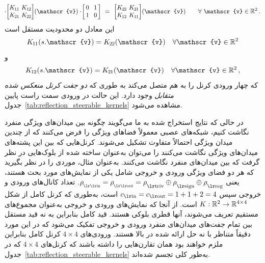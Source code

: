\begin{itemize}
\begin{align}
		\!\cdot\!
		\begin{bmatrix} \Koo &\mkern-12mu \Kot \\ \Kto &\mkern-12mu \Ktt \end{bmatrix} \mkern-4mu (\mathscr{v})
		\cdot\!
		\begin{bmatrix} \hspace{1.5pt} 0 &\mkern-4mu 1 \hspace*{1.5pt} \\ \hspace{1.5pt} 1 &\mkern-4mu 0 \hspace*{1.5pt} \end{bmatrix}
		\ =\ 
		\begin{bmatrix} \Ktt &\mkern-12mu \Kto \\ \Kot &\mkern-12mu \Koo \end{bmatrix} \mkern-4mu (\mathscr{v})
		\qquad \forall\ \mathscr{v} \in \R^2 \,.
	\end{align}
	این معادل دو محدودیت مستقل است
	\begin{align}
		\Koo(s.\mathscr{v}) = \Ktt(\mathscr{v}) \quad \forall \mathscr{v} \in \R^2
	\end{align}
	و
	\begin{align}
		\Kot(s.\mathscr{v}) = \Kto(\mathscr{v}) \quad \forall \mathscr{v} \in \R^2 \,,
	\end{align}
	که چهار ورودی کرنل را به هم متصل می‌کند به طوری که \emph{دو جفت کرنل منعکس شده متقابل} وجود دارد.
	این حالت در ورودی سمت راست پایین جدول~\ref{tab:reflection_steerable_kernels} مشاهده می‌شود.
\end{itemize}

در حالی که نتایج استخراج شده به ما می‌گویند چگونه بین میدان‌های ویژگی منفرد نگاشت کنیم، شبکه‌های عصبی معمولاً فضاهای ویژگی را فرض می‌کنند که از چندین میدان ویژگی احتمالاً متفاوت تشکیل می‌شوند.
کرنل‌هایی که بین این پشته‌های میدان‌های ویژگی نگاشت می‌کنند را می‌توان به‌عنوان ساخته شده از بلوک‌هایی در نظر گرفت که بین میدان‌های منفرد نگاشت می‌کنند.
به‌عنوان مثال، موردی را در نظر بگیرید که هر دو فضای ویژگی ورودی و خروجی شامل یکی از نمایش‌های مورد بحث هستند، یعنی $\rhoin = \rhoout = \rhotriv \oplus \rhosign \oplus \rhoreg$.
تعداد کانال‌های ورودی و خروجی سپس $\cin=\cout=1+1+2=4$ است، به‌طوری که کرنل کامل از شکل $K: \mathbb{R}^2 \to \mathbb{R}^{4\times4}$ است.
از آنجا که نمایش‌های ورودی و خروجی به‌عنوان مجموع‌های مستقیم تعریف می‌شوند، آنها قطری بلوکی هستند.
قید کامل بنابراین به نه قید مستقل بین تمام جفت‌های میدان‌های منفرد ورودی و خروجی تفکیک می‌شود که در این مورد دقیقاً متناظر با نه حل ارائه شده در بالا هستند.
ورودی‌های $4\times4$ کرنل کامل بنابراین ملزم خواهند بود همان تقارن‌هایی را داشته باشند که کرنل‌های $4\times4$ که در جدول~\ref{tab:reflection_steerable_kernels} به‌طور کلی تجسم شده‌اند.

